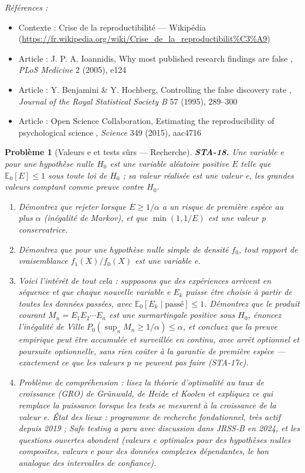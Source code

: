 \documentclass[11pt]{article}
\newtheorem{problem}{Problème}
\newenvironment{refs}{\par\small\noindent\emph{Références :}\begin{itemize}\setlength\itemsep{0pt}}{\end{itemize}\normalsize}
\begin{document}
\begin{refs}
\item Contexte : Crise de la reproductibilité --- Wikipédia (\url{https://fr.wikipedia.org/wiki/Crise_de_la_reproductibilit%C3%A9})
\item Article : J. P. A. Ioannidis, \og{} Why most published research findings are false \fg{}, \textit{PLoS Medicine} 2 (2005), e124
\item Article : Y. Benjamini \& Y. Hochberg, \og{} Controlling the false discovery rate \fg{}, \textit{Journal of the Royal Statistical Society B} 57 (1995), 289--300
\item Article : Open Science Collaboration, \og{} Estimating the reproducibility of psychological science \fg{}, \textit{Science} 349 (2015), aac4716
\end{refs}

\bigskip

\begin{problem}[{Valeurs e et tests sûrs --- Recherche}]
\textbf{STA-18.} Une \textit{variable e} pour une hypothèse nulle $ H_0 $ est une variable
aléatoire positive $ E $ telle que $ \mathbb{E}_0[E] \le 1 $ sous toute loi de $ H_0 $ ; sa
valeur réalisée est une valeur e, les grandes valeurs comptant comme preuve contre
$ H_0 $.
\begin{enumerate}
\item[(a)] Démontrez que rejeter lorsque $ E \ge 1/\alpha $ a un risque de première espèce au plus
$ \alpha $ (inégalité de Markov), et que $ \min(1, 1/E) $ est une valeur p conservatrice.
\item[(b)] Démontrez que pour une hypothèse nulle simple de densité $ f_0 $, tout rapport de
vraisemblance $ f_1(X)/f_0(X) $ est une variable e.
\item[(c)] Voici l'intérêt de tout cela : supposons que des expériences arrivent en séquence et que chaque
nouvelle variable e $ E_k $ puisse être choisie à partir de toutes les données passées, avec
$ \mathbb{E}_0[E_k \mid \text{passé}] \le 1 $. Démontrez que le produit courant
$ M_n = E_1 E_2 \cdots E_n $ est une surmartingale positive sous $ H_0 $, énoncez l'inégalité de
Ville $ P_0\!\left( \sup_n M_n \ge 1/\alpha \right) \le \alpha $, et concluez que la preuve
empirique peut être accumulée et surveillée en continu, avec arrêt optionnel et poursuite
optionnelle, sans rien coûter à la garantie de première espèce --- exactement ce que les valeurs p ne
peuvent pas faire (STA-17c).
\item[(d)] Problème de compréhension : lisez la théorie d'optimalité au taux de croissance (GRO) de
Grünwald, de Heide et Koolen et expliquez ce qui remplace la \og{} puissance \fg{} lorsque les tests se
mesurent à la croissance de la valeur e.
\textit{État des lieux : programme de recherche fondationnel, très actif depuis 2019 ; \og{} Safe testing \fg{}
a paru avec discussion dans JRSS-B en 2024, et les questions ouvertes abondent (valeurs e optimales
pour des hypothèses nulles composites, valeurs e pour des données complexes dépendantes, le bon
analogue des intervalles de confiance).}
\end{enumerate}

\end{problem}
\end{document}
